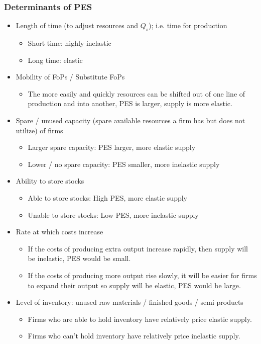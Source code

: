 \documentclass[a4paper,12pt]{article}
\begin{document}
\subsubsection*{Determinants of PES}
\begin{itemize}
  \item Length of time (to adjust resources and $Q_s$); i.e. time for production
  \begin{itemize}
    \item Short time: highly inelastic
    \item Long time: elastic
  \end{itemize}
  \item Mobility of FoPs / Substitute FoPs
  \begin{itemize}
    \item The more easily and quickly resources can be shifted out of one line of production and into another, PES is larger, supply is more elastic.
  \end{itemize}
  \item Spare / unused capacity (spare available resources a firm has but does not utilize) of firms
  \begin{itemize}
    \item Larger spare capacity: PES larger, more elastic supply
    \item Lower / no spare capacity: PES smaller, more inelastic supply
  \end{itemize}
  \item Ability to store stocks
  \begin{itemize}
    \item Able to store stocks: High PES, more elastic supply
    \item Unable to store stocks: Low PES, more inelastic supply
  \end{itemize}
  \item Rate at which costs increase
  \begin{itemize}
    \item If the costs of producing extra output increase rapidly, then supply will be inelastic, PES would be small.
    \item If the costs of producing more output rise slowly, it will be easier for firms to expand their output so supply will be elastic, PES would be large.
  \end{itemize}
\item Level of inventory: unused raw materials / finished goods / semi-products
\begin{itemize}
    \item Firms who are able to hold inventory have relatively price elastic supply.
    \item Firms who can't hold inventory have relatively price inelastic supply.
    \end{itemize}
\end{itemize}
\end{document}
